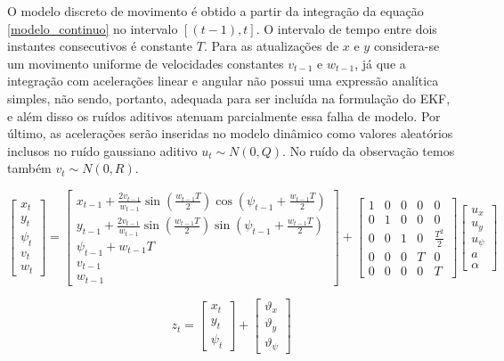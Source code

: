 \documentclass[paper=a4, fontsize=11pt]{scrartcl}
\begin{document}
O modelo discreto de movimento é obtido a partir da integração da equação \eqref{modelo_continuo} no intervalo $[(t-1),t]$. O intervalo de tempo entre dois instantes consecutivos é constante $T$. Para as atualizações de $x$ e $y$ considera-se um movimento uniforme de velocidades constantes $v_{t-1}$ e $w_{t-1}$, já que a integração com acelerações linear e angular não possui uma expressão analítica simples, não sendo, portanto, adequada para ser incluída na formulação do EKF, e além disso os ruídos aditivos atenuam parcialmente essa falha de modelo. Por último, as acelerações serão inseridas no modelo dinâmico como valores aleatórios inclusos no ruído gaussiano aditivo $u_t \sim N(0,Q)$. No ruído da observação temos também $v_t \sim N(0,R)$.

\begin{equation}
\label{update_equation}
\begin{bmatrix} x_t \\ y_t \\ \psi_t \\ v_t \\ w_t \end{bmatrix}
= \begin{bmatrix}
x_{t-1}+\frac{2v_{t-1}}{w_{t-1}} \sin{\left(\frac{w_{t-1}T}{2}\right)}\cos{\left(\psi_{t-1}+\frac{w_{t-1}T}{2}\right)} \\
y_{t-1}+\frac{2v_{t-1}}{w_{t-1}} \sin{\left(\frac{w_{t-1}T}{2}\right)}\sin{\left(\psi_{t-1}+\frac{w_{t-1}T}{2}\right)} \\
\psi_{t-1}+w_{t-1}T \\ v_{t-1} \\ w_{t-1} \end{bmatrix} +
\begin{bmatrix} 1 & 0 & 0 & 0 & 0 \\ 0 & 1 & 0 & 0 & 0 \\ 0 & 0 & 1 & 0 & \frac{T^2}{2} \\ 0 & 0 & 0 & T & 0 \\ 0 & 0 & 0 & 0 & T \end{bmatrix}
\begin{bmatrix} u_x \\ u_y \\ u_{\psi} \\ a \\ \alpha \end{bmatrix}
\end{equation}

\begin{equation}
    \label{observation}
    z_t = 
    \begin{bmatrix} x_t \\ y_t \\ \psi_t \end{bmatrix}
    +
    \begin{bmatrix} \vartheta_x \\ \vartheta_y \\ \vartheta_{\psi} \end{bmatrix}
\end{equation}
\end{document}

